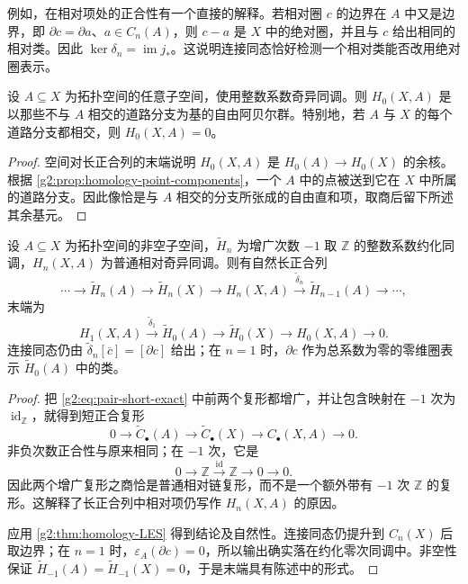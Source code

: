 例如，在相对项处的正合性有一个直接的解释。若相对圈 \(c\) 的边界在 \(A\) 中又是边界，即 \(\partial c=\partial a\)、\(a\in C_n(A)\)，则 \(c-a\) 是 \(X\) 中的绝对圈，并且与 \(c\) 给出相同的相对类。因此 \(\ker\delta_n=\operatorname{im}j_*\)。这说明连接同态恰好检测一个相对类能否改用绝对圈表示。

\begin{corollary}\label{g2:cor:relative-zero-homology}
	设 \(A\subseteq X\) 为拓扑空间的任意子空间，使用整数系数奇异同调。则 \(H_0(X,A)\) 是以那些不与 \(A\) 相交的道路分支为基的自由阿贝尔群。特别地，若 \(A\) 与 \(X\) 的每个道路分支都相交，则 \(H_0(X,A)=0\)。
\end{corollary}
\begin{proof}
	空间对长正合列的末端说明 \(H_0(X,A)\) 是 \(H_0(A)\to H_0(X)\) 的余核。根据 \cref{g2:prop:homology-point-components}，一个 \(A\) 中的点被送到它在 \(X\) 中所属的道路分支。因此像恰是与 \(A\) 相交的分支所张成的自由直和项，取商后留下所述其余基元。
\end{proof}

\begin{proposition}\label{g2:prop:reduced-pair-LES}
	设 \(A\subseteq X\) 为拓扑空间的非空子空间，\(\widetilde H_n\) 为增广次数 \(-1\) 取 \(\mathbb Z\) 的整数系数约化同调，\(H_n(X,A)\) 为普通相对奇异同调。则有自然长正合列
	\[
		\cdots\longrightarrow\widetilde H_n(A)
		\longrightarrow\widetilde H_n(X)
		\longrightarrow H_n(X,A)
		\xrightarrow{\widetilde\delta_n}\widetilde H_{n-1}(A)
		\longrightarrow\cdots,
	\]
	末端为
	\[
		H_1(X,A)\xrightarrow{\widetilde\delta_1}\widetilde H_0(A)
		\longrightarrow\widetilde H_0(X)
		\longrightarrow H_0(X,A)\longrightarrow0.
	\]
	连接同态仍由 \(\widetilde\delta_n[\overline c]=[\partial c]\) 给出；在 \(n=1\) 时，\(\partial c\) 作为总系数为零的零维圈表示 \(\widetilde H_0(A)\) 中的类。
\end{proposition}
\begin{proof}
	把 \eqref{g2:eq:pair-short-exact} 中前两个复形都增广，并让包含映射在 \(-1\) 次为 \(\operatorname{id}_{\mathbb Z}\)，就得到短正合复形
	\[
		0\longrightarrow\widetilde C_\bullet(A)
		\longrightarrow\widetilde C_\bullet(X)
		\longrightarrow C_\bullet(X,A)\longrightarrow0.
	\]
	非负次数正合性与原来相同；在 \(-1\) 次，它是
	\[
		0\longrightarrow\mathbb Z
		\xrightarrow{\operatorname{id}}\mathbb Z
		\longrightarrow0\longrightarrow0.
	\]
	因此两个增广复形之商恰是普通相对链复形，而不是一个额外带有 \(-1\) 次 \(\mathbb Z\) 的复形。这解释了长正合列中相对项仍写作 \(H_n(X,A)\) 的原因。

	应用 \cref{g2:thm:homology-LES} 得到结论及自然性。连接同态仍提升到 \(C_n(X)\) 后取边界；在 \(n=1\) 时，\(\varepsilon_A(\partial c)=0\)，所以输出确实落在约化零次同调中。非空性保证 \(\widetilde H_{-1}(A)=\widetilde H_{-1}(X)=0\)，于是末端具有陈述中的形式。
\end{proof}

